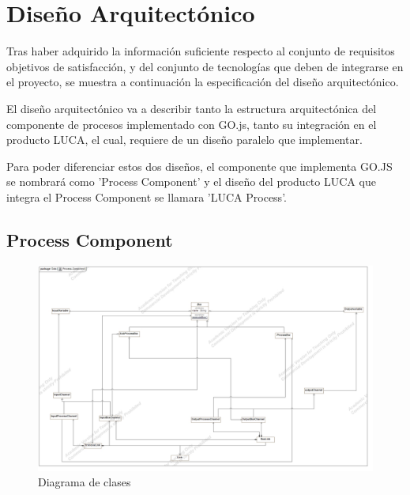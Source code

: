 \documentclass[a4paper,12pt]{book}
\begin{document}
	
	\afterpage{\null\newpage}
	\newpage
	
	\chapter{Diseño Arquitectónico}
	
	Tras haber adquirido la información suficiente respecto al conjunto de requisitos objetivos de satisfacción, y del conjunto de tecnologías que deben de integrarse en el proyecto, se muestra a continuación la especificación del diseño arquitectónico.
	
	\vspace{5mm}
	
	El diseño arquitectónico va a describir tanto la estructura arquitectónica del componente de procesos implementado con GO.js, tanto su integración en el producto LUCA, el cual, requiere de un diseño paralelo que implementar.
	
	
	\minitoc
	
	\vspace{5mm}
	
	Para poder diferenciar estos dos diseños, el componente que implementa GO.JS se nombrará como 'Process Component' y el diseño del producto LUCA que integra el Process Component se llamara 'LUCA Process'.
	
		\section{Process Component}
		
		
		\begin{figure}[H]
			\centering
			\includegraphics[scale=0.25]{Process-Component.jpg}
			\caption{Diagrama de clases}\label{fig:Process-Component}
		\end{figure}
		
\end{document}
